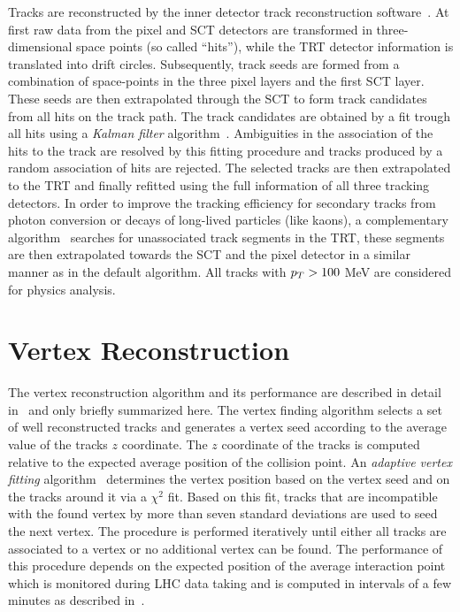 Tracks are reconstructed  by the inner detector track reconstruction software~\cite{IDtracking}.
At first raw data from the pixel and SCT detectors are transformed in three-dimensional space points 
(so called ``hits''), while the  TRT detector information is translated into drift circles. 
Subsequently, track seeds are formed from a combination of space-points in the three pixel layers and the first SCT layer. These
seeds are then extrapolated through the SCT to form track candidates  from all hits on the track path. The track candidates are obtained by a 
fit trough all hits using a \emph{Kalman filter} algorithm~\cite{Kalman}. Ambiguities in the  association of the hits to the track 
are resolved by this fitting procedure and  tracks produced by a random association of hits are rejected. The selected tracks are then 
extrapolated to the TRT and finally refitted using the full information of all three tracking detectors. 
In order to  improve the tracking efficiency for secondary tracks  from photon conversion or decays 
of long-lived particles (like kaons), a complementary algorithm~\cite{IDtracking} searches 
for unassociated track segments in the TRT, these segments are then extrapolated towards the SCT and the pixel detector in
a similar manner as in the default algorithm. All tracks with $p_{T} > 100$ MeV are considered for physics
analysis.


\section{Vertex Reconstruction}
The vertex reconstruction algorithm and its performance are described in detail in~\cite{AtlasCSCBook,VertexPerf} and
only briefly summarized here.
The vertex finding algorithm selects a set of well reconstructed tracks and generates
a vertex  seed according to the average value of the tracks $z$ coordinate. The $z$ coordinate of the tracks
is computed relative to  the expected average position of the collision point. 
An \emph{adaptive vertex fitting} algorithm~\cite{Vertex} determines the vertex position based on the vertex seed  and on the 
tracks around it via a $\chi^2$ fit.  Based on this fit, tracks that are incompatible with the found vertex by more than seven standard deviations
are used to seed the next vertex. The procedure is performed iteratively until either all tracks are associated to a vertex
 or no additional vertex can be found.
The performance of this procedure depends  on the expected position of the average interaction point which is monitored 
during LHC data taking and is computed in intervals of a  few minutes as described in~\cite{beamspot}.

